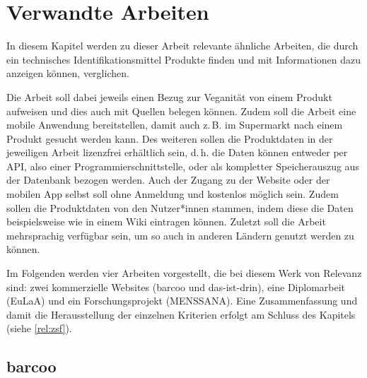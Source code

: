 \chapter{Verwandte Arbeiten}
\label{chap:related_work}

In diesem Kapitel werden zu dieser Arbeit relevante ähnliche Arbeiten,
die durch ein technisches Identifikationsmittel Produkte finden und
mit Informationen dazu anzeigen können, verglichen.

Die Arbeit soll dabei jeweils einen Bezug zur Veganität von einem
Produkt aufweisen und dies auch mit Quellen belegen können.
Zudem soll die Arbeit eine mobile Anwendung bereitstellen, damit auch
z.\,B. im Supermarkt nach einem Produkt gesucht werden kann.
Des weiteren sollen die Produktdaten in der jeweiligen Arbeit
lizenzfrei erhältlich sein, d.\,h. die Daten können entweder per
\ac{API}, also einer Programmierschnittstelle, oder als kompletter
Speicherauszug aus der Datenbank bezogen werden.
Auch der Zugang zu der Website oder der mobilen App selbst soll ohne
Anmeldung
und kostenlos möglich sein.
Zudem sollen die Produktdaten von den Nutzer*innen stammen, indem
diese die Daten beispielsweise wie in einem Wiki eintragen können.
Zuletzt soll die Arbeit mehrsprachig verfügbar sein, um so auch in
anderen Ländern genutzt werden zu können.

Im Folgenden werden vier Arbeiten
vorgestellt, die bei diesem Werk von Relevanz sind: zwei
kommerzielle Websites (barcoo und das-ist-drin), eine Diplomarbeit
(\acs{EuLaA}) und ein Forschungsprojekt 
(\acs{MENSSANA}).
Eine Zusammenfassung und damit die Herausstellung der einzelnen
Kriterien erfolgt am Schluss des Kapitels (siehe \ref{rel:zsf}).

\section{barcoo}
\label{sec:related:barcoo}

